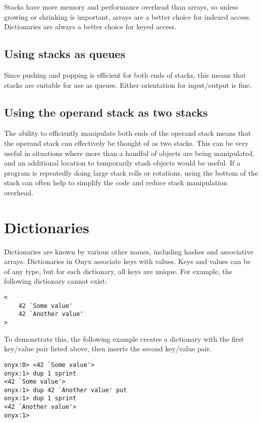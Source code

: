 Stacks have more memory and performance overhead than arrays, so unless growing
or shrinking is important, arrays are a better choice for indexed access.
Dictionaries are always a better choice for keyed access.

\subsection{Using stacks as queues}

Since pushing and popping is efficient for both ends of stacks, this means that
stacks are suitable for use as queues.  Either orientation for input/output is
fine.

\subsection{Using the operand stack as two stacks}

The ability to efficiently manipulate both ends of the operand stack means that
the operand stack can effectively be thought of as two stacks.  This can be very
useful in situations where more than a handful of objects are being manipulated,
and an additional location to temporarily stash objects would be useful.  If a
program is repeatedly doing large stack rolls or rotations, using the bottom of
the stack can often help to simplify the code and reduce stack manipulation
overhead.

\section{Dictionaries}

Dictionaries are known by various other names, including hashes and associative
arrays.  Dictionaries in Onyx associate keys with values.  Keys and values can
be of any type, but for each dictionary, all keys are unique.  For example, the
following dictionary cannot exist:

\begin{verbatim}
<
    42 `Some value'
    42 `Another value'
>
\end{verbatim}

To demonstrate this, the following example creates a dictionary with the first
key/value pair listed above, then inserts the second key/value pair.

\begin{verbatim}
onyx:0> <42 `Some value'>
onyx:1> dup 1 sprint
<42 `Some value'>
onyx:1> dup 42 `Another value' put
onyx:1> dup 1 sprint
<42 `Another value'>
onyx:1>
\end{verbatim}

